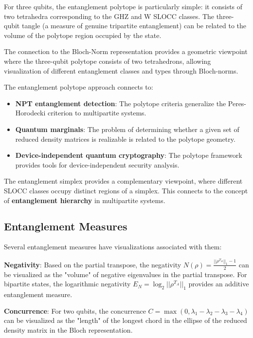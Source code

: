\documentclass[12pt,a4paper]{article}
\begin{document}
For three qubits, the entanglement polytope is particularly simple: it consists of two tetrahedra corresponding to the GHZ and W SLOCC classes. The three-qubit tangle (a measure of genuine tripartite entanglement) can be related to the volume of the polytope region occupied by the state.

The connection to the Bloch-Norm representation \cite{Benedito2025} provides a geometric viewpoint where the three-qubit polytope consists of two tetrahedrons, allowing visualization of different entanglement classes and types through Bloch-norms.

The entanglement polytope approach connects to:
\begin{itemize}
	\item \textbf{NPT entanglement detection}: The polytope criteria generalize the Peres-Horodecki criterion to multipartite systems.
	\item \textbf{Quantum marginals}: The problem of determining whether a given set of reduced density matrices is realizable is related to the polytope geometry.
	\item \textbf{Device-independent quantum cryptography}: The polytope framework provides tools for device-independent security analysis.
\end{itemize}

The entanglement simplex provides a complementary viewpoint, where different SLOCC classes occupy distinct regions of a simplex. This connects to the concept of \textbf{entanglement hierarchy} in multipartite systems.

\subsection{Entanglement Measures}
\label{sec:measures}

Several entanglement measures have visualizations associated with them:

\textbf{Negativity}: Based on the partial transpose, the negativity $N(\rho) = \frac{||\rho^{T_A}||_1 - 1}{2}$ can be visualized as the "volume" of negative eigenvalues in the partial transpose. For bipartite states, the logarithmic negativity $E_N = \log_2 ||\rho^{T_A}||_1$ provides an additive entanglement measure.

\textbf{Concurrence}: For two qubits, the concurrence $C = \max(0, \lambda_1 - \lambda_2 - \lambda_3 - \lambda_4)$ can be visualized as the "length" of the longest chord in the ellipse of the reduced density matrix in the Bloch representation.
\end{document}
